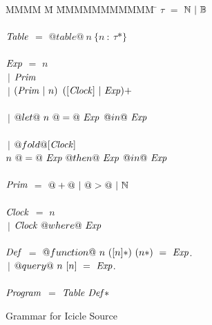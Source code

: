 
\begin{figure}

\begin{tabbing}
MMMM \= M \= MMMMMMMMMMM \= \kill
$\tau$          \> $=$  \> $\mathbb{N}~|~\mathbb{B}$ \\
\\
$\mathit{Table}$    \> $=$  \> $@table@~n~\{n~:~\tau*\}$ \\
\\
$\mathit{Exp}$
    \> $=$  \> $n$          \\
    \> $~|$ \> $\mathit{Prim}$     \\
    \> $~|$ \> $(\mathit{Prim}~|~n)$     \> $([\mathit{Clock}]~|~\mathit{Exp})+$ \\
\\
    \> $~|$ \> $@let@~n~@=@~\mathit{Exp}$
            \> $@in@~\mathit{Exp}$ \\
                \\
    \> $~|$ \> $@fold@[\mathit{Clock}]$ \\
    \>      \> $n~@=@~\mathit{Exp}~@then@~\mathit{Exp}$
            \> $@in@~\mathit{Exp}$ \\
\\
$\mathit{Prim}$
    \> $=$  \> $@+@~|~@>@~|~\mathbb{N}$ \\
\\
$\mathit{Clock}$
    \> $=$  \> $n$          \\
    \> $~|$ \> $\mathit{Clock}~@where@~\mathit{Exp}$          \\
\\
$\mathit{Def}$
    \> $=$  \> $@function@~n~([n]*)~(n*)~=~\mathit{Exp}$.          \\
    \> $~|$ \> $@query@~n~[n]~=~\mathit{Exp}$.          \\
\\
$\mathit{Program}$
    \> $=$  \> $\mathit{Table}~\mathit{Def}*$ \\
\end{tabbing}


\caption{Grammar for Icicle Source}
\label{fig:source:grammar}
\end{figure}

